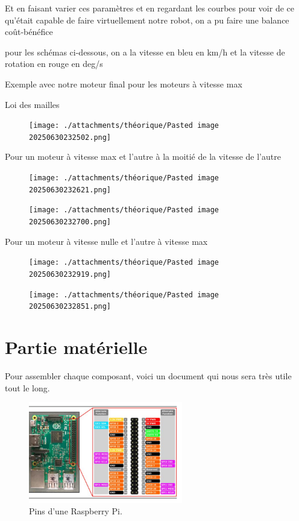 \documentclass[a4paper,12pt]{report}  %
\begin{document}
Et en faisant varier ces paramètres et en regardant les courbes pour voir de ce qu'était capable de faire virtuellement notre robot, on a pu faire une balance coût-bénéfice 

pour les schémas ci-dessous, on a la vitesse en bleu en km/h et la vitesse de rotation en rouge en deg/s

Exemple avec notre moteur final pour les moteurs à vitesse max

Loi des mailles 
\begin{figure}[H]
	\centering
	\texttt{[image: ./attachments/théorique/Pasted image 20250630232502.png]}
	\caption{}
\end{figure}

Pour un moteur à vitesse max et l'autre à la moitié de la vitesse de l'autre 
\begin{figure}[H]
	\centering
	\texttt{[image: ./attachments/théorique/Pasted image 20250630232621.png]}
	\caption{}
\end{figure}
\begin{figure}[H]
	\centering
	\texttt{[image: ./attachments/théorique/Pasted image 20250630232700.png]}
	\caption{}
\end{figure}

Pour un moteur à vitesse nulle et l'autre à vitesse max
\begin{figure}[H]
	\centering
	\texttt{[image: ./attachments/théorique/Pasted image 20250630232919.png]}
	\caption{}
\end{figure}

\begin{figure}[H]
	\centering
	\texttt{[image: ./attachments/théorique/Pasted image 20250630232851.png]}
	\caption{}
\end{figure}





\pagebreak
\section{Partie matérielle}
Pour assembler chaque composant, voici un document qui nous sera très utile tout le long. 

\begin{figure}[H]
	\centering
	\includegraphics[width=0.6\textwidth]{./attachments/raspberry_pi_pin_map.jpg}
	\caption{Pins d'une Raspberry Pi. }
\end{figure}
\end{document}

